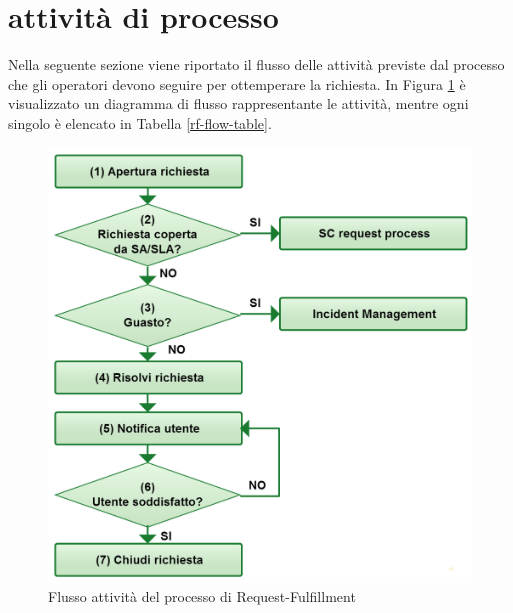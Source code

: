 %
%
\section[Attività di processo]{attività di processo}
\label{rf-flow}
Nella seguente sezione viene riportato il flusso delle attività previste dal processo che gli operatori devono seguire per ottemperare la richiesta. In Figura \ref{rf-flow-img} è visualizzato un diagramma di flusso rappresentante le attività, mentre ogni singolo  è elencato in Tabella \ref{rf-flow-table}.
\begin{figure}[htbp]
\centering
\includegraphics[scale=0.4]{Images/Diagrams/Request_fulfillment.png}
\caption{Flusso attività del processo di \ac{Request-Fulfillment}}
\label{rf-flow-img}
\end{figure}


